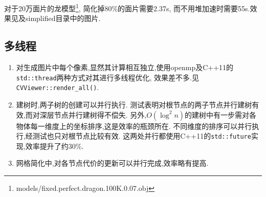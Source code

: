 对于20万面片的龙模型\footnote{models/fixed.perfect.dragon.100K.0.07.obj},
简化掉80\%的面片需要2.37s, 而不用堆加速时需要55s.效果见及simplified目录中的图片.

\subsection{多线程}
\begin{enumerate}
  \item 对生成图片中每个像素,显然其计算相互独立,使用openmp及C++11的\verb|std::thread|两种方式对其进行多线程优化,
    效果差不多.见\verb|CVViewer::render_all()|.

  \item 建树时,两子树的创建可以并行执行.
    测试表明对根节点的两子节点并行建树有效,而对深层节点并行建树得不偿失.
    另外,$O(\log^2 n)$的建树中有一步需对各物体每一维度上的坐标排序,这是效率的瓶颈所在.
    不同维度的排序可以并行执行,经测试也只对根节点比较有效.
    这两处并行都使用C++11的\verb|std::future|实现,效率提升了约30\%.

  \item 网格简化中,对各节点代价的更新可以并行完成,效率略有提高.
\end{enumerate}
